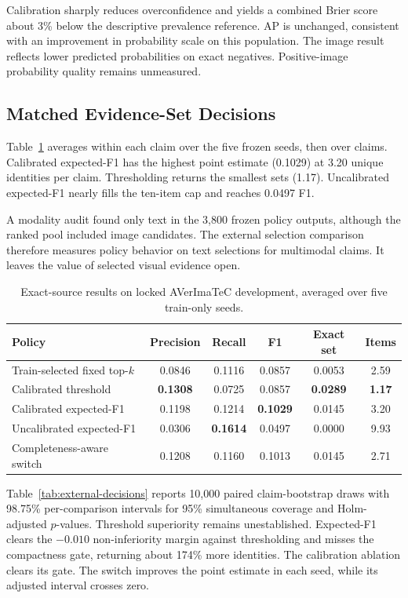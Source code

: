 Calibration sharply reduces overconfidence and yields a combined Brier score about 3\% below the descriptive prevalence reference. AP is unchanged, consistent with an improvement in probability scale on this population. The image result reflects lower predicted probabilities on exact negatives. Positive-image probability quality remains unmeasured.

\subsection{Matched Evidence-Set Decisions}

Table~\ref{tab:external-selectors} averages within each claim over the five frozen seeds, then over claims. Calibrated expected-F1 has the highest point estimate (0.1029) at 3.20 unique identities per claim. Thresholding returns the smallest sets (1.17). Uncalibrated expected-F1 nearly fills the ten-item cap and reaches 0.0497 F1.

A modality audit found only text in the 3,800 frozen policy outputs, although the ranked pool included image candidates. The external selection comparison therefore measures policy behavior on text selections for multimodal claims. It leaves the value of selected visual evidence open.

\begin{table}[t]
\centering
\caption{Exact-source results on locked AVerImaTeC development, averaged over five train-only seeds.}
\label{tab:external-selectors}
\small
\setlength{\tabcolsep}{7pt}
\begin{tabular}{lccccc}
\toprule
Policy & Precision & Recall & F1 & Exact set & Items \\
\midrule
Train-selected fixed top-$k$ & 0.0846 & 0.1116 & 0.0857 & 0.0053 & 2.59 \\
Calibrated threshold & \textbf{0.1308} & 0.0725 & 0.0857 & \textbf{0.0289} & \textbf{1.17} \\
Calibrated expected-F1 & 0.1198 & 0.1214 & \textbf{0.1029} & 0.0145 & 3.20 \\
Uncalibrated expected-F1 & 0.0306 & \textbf{0.1614} & 0.0497 & 0.0000 & 9.93 \\
Completeness-aware switch & 0.1208 & 0.1160 & 0.1013 & 0.0145 & 2.71 \\
\bottomrule
\end{tabular}
\end{table}

Table~\ref{tab:external-decisions} reports 10,000 paired claim-bootstrap draws with 98.75\% per-comparison intervals for 95\% simultaneous coverage and Holm-adjusted $p$-values. Threshold superiority remains unestablished. Expected-F1 clears the $-0.010$ non-inferiority margin against thresholding and misses the compactness gate, returning about 174\% more identities. The calibration ablation clears its gate. The switch improves the point estimate in each seed, while its adjusted interval crosses zero.


